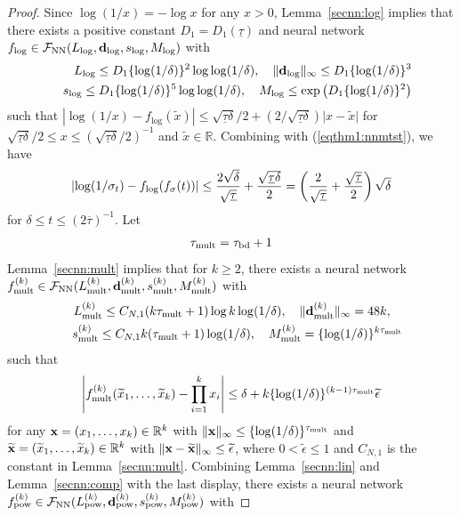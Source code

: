 \documentclass[twoside,11pt]{article}
\def\cF{\mathcal F}
\newcommand{\bd}{{\bf d}}
\newcommand{\bx}{{\bf x}}
\newcommand{\bbR}{{\mathbb R}}
\newcommand{\be}{\begin{equation}}
\newcommand{\ee}{\end{equation}}
\newcommand{\bean}{\setlength\arraycolsep{1pt}\begin{eqnarray*}}
\newcommand{\eean}{\end{eqnarray*}}
\begin{document}
\begin{proof}
Since $\log (1/x) = -\log x$ for any $x > 0$, Lemma~\ref{secnn:log} implies that there exists a positive constant $D_{1} = D_{1}(\underline{\tau})$ and neural network $f_{\log} \in \cF_{\rm NN}(L_{\log}, \bd_{\log}, s_{\log}, M_{\log})$ with
\bean
&& L_{\log} \leq D_{1} \{ \log(1/\delta)\}^{2} \log \log (1/\delta), \quad \|\bd_{\log}\|_{\infty}\leq D_{1}  \{ \log(1/\delta)\}^{3}
\\
&& s_{\log}  \leq D_{1}  \{ \log(1/\delta)\}^{5} \log \log (1/\delta), \quad M_{\log} \leq \exp \left( D_{1} \{\log (1/\delta) \}^{2} \right)
\eean
such that $
\left\vert \log (1/x) - f_{\log}(\widetilde x) \right\vert \leq \sqrt{\underline{\tau} \delta}/2 + (2/\sqrt{\underline{\tau} \delta}) \vert x - \widetilde x \vert
$
for $\sqrt{\underline{\tau} \delta}/2 \leq x \leq (\sqrt{\underline{\tau} \delta}/2)^{-1}$ and $\widetilde x \in \bbR$.
Combining with (\ref{eqthm1:nnmtst}), we have
\be \begin{split}
 \left\vert \log(1/\sigma_{t}) - f_{\rm log}(f_{\sigma}(t)  ) \right\vert \leq   \frac{2 \sqrt{\delta}}{\sqrt{\underline{\tau}}} + \frac{\sqrt{\underline{\tau} \delta}}{2} = \left(\frac{2}{\sqrt{\underline{\tau}}} + \frac{\sqrt{\underline{\tau}}}{2}   \right) \sqrt{\delta} \label{eqthm1:logbd}
\end{split} \ee
for $\delta \leq t \leq (2 \overline{\tau})^{-1}$.
Let 
\bean
\tau_{\rm mult} = \tau_{\rm bd} + 1
\eean
Lemma~\ref{secnn:mult} implies that for $k \geq 2$, there exists a neural network $f_{\rm mult}^{(k)} \in \cF_{\rm NN}(L_{\rm mult}^{(k)}, \bd_{\rm mult}^{(k)}, s_{\rm mult}^{(k)}, M_{\rm mult}^{(k)})$ with 
\bean
&& L_{\rm mult}^{(k)} \leq C_{N,1} (k \tau_{\rm mult} +1)  \log k  \log (1/\delta) , \quad \| \bd_{\rm mult}^{(k)} \|_{\infty} = 48k, \quad
\\
&& s_{\rm mult}^{(k)} \leq  C_{N,1}k(\tau_{\rm mult}+1)   \log(1/\delta) , \quad M_{\rm mult}^{(k)} = \{\log (1/\delta) \}^{k\tau_{\rm mult}}  \label{eqthm1:nnmultcomp}
\eean
such that 
\be
\left\vert f_{\rm mult}^{(k)}(\widetilde x_1,\ldots, \widetilde x_k) - \prod_{i=1}^{k} x_i \right\vert \leq \delta + k \{\log (1/\delta)\}^{(k-1)\tau_{\rm mult}}\widetilde \epsilon \label{eqthm1:mult}
\ee
for any $\bx = (x_1,\ldots,x_k) \in \bbR^{k}$ with $ \|\bx\|_{\infty} \leq \{\log (1/\delta)\}^{\tau_{\rm mult} }$ and $\widetilde \bx = (\widetilde x_1,\ldots,\widetilde x_{k}) \in \bbR^{k}$ with $\| \bx - \widetilde \bx\|_{\infty} \leq \widetilde \epsilon$,
where $0 < \widetilde \epsilon \leq 1 $ and $C_{N,1}$ is the constant in Lemma~\ref{secnn:mult}.
Combining Lemma~\ref{secnn:lin} and Lemma~\ref{secnn:comp} with the last display, there exists a neural network $f_{\rm pow}^{(k)} \in \cF_{\rm NN}(L_{\rm pow}^{(k)}, \bd_{\rm pow}^{(k)},  s_{\rm pow}^{(k)} ,  M_{\rm pow}^{(k)}  )$ with

\end{proof}
\end{document}
